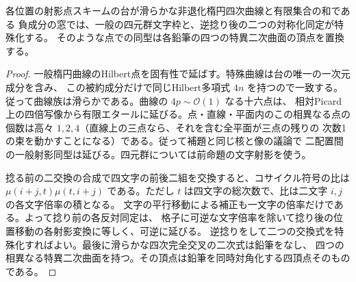 \begin{proposition}\label{prop:elliptic-component-frames}
各位置の射影点スキームの台が滑らかな非退化楕円四次曲線と有限集合の和である
負成分の窓では、一般の四元群文字枠と、逆捻り後の二つの対称化同定が特殊化する。
そのような点での同型は各鉛筆の四つの特異二次曲面の頂点を置換する。
\end{proposition}
\begin{proof}
一般楕円曲線のHilbert点を固有性で延ばす。特殊曲線は台の唯一の一次元成分を含み、
この被約成分だけで同じHilbert多項式 $4n$ を持つので一致する。
従って曲線族は滑らかである。曲線の $4p\sim\mathcal O(1)$ なる十六点は、
相対Picard上の四倍写像から有限エタールに延びる。点・直線・平面内のこの相異なる点の
個数は高々 $1,2,4$（直線上の三点なら、それを含む全平面が三点の残りの
次数1の束を動かすことになる）である。従って補題と同じ核と像の議論で
二配置間の一般射影同型は延びる。四元群については前命題の文字射影を使う。

捻る前の二交換の合成で四文字の前後二組を交換すると、コサイクル符号の比は
$\mu(i+j,t)\mu(t,i+j)$ である。ただし $t$ は四文字の総次数で、比は二文字 $i,j$ の各文字倍率の積となる。
文字の平行移動による補正も一文字の倍率だけである。よって捻り前の各反対同定は、
格子に可逆な文字倍率を除いて捻り後の位置移動の各射影変換に等しく、可逆に延びる。
逆捻りをして二つの交換式を特殊化すればよい。最後に滑らかな四次完全交叉の二次式は鉛筆をなし、
四つの相異なる特異二次曲面を持つ。その頂点は鉛筆を同時対角化する四頂点そのものである。
\end{proof}

